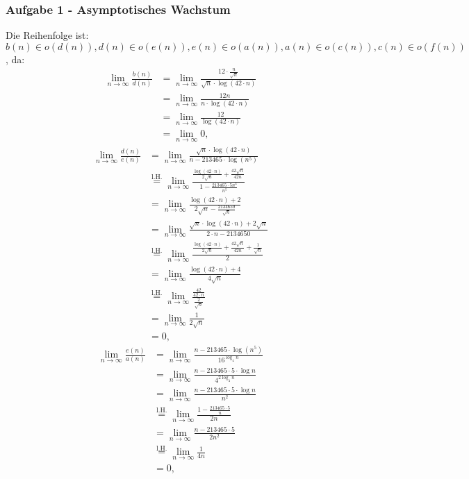 \documentclass[11pt]{scrartcl}
\newcommand{\task}[1]{\subsubsection*{#1}}
\begin{document}
\task{Aufgabe 1 - Asymptotisches Wachstum}
Die Reihenfolge ist: $ b(n) \in o(d(n)), d(n) \in o(e(n)), e(n) \in o(a(n)), a(n) \in o(c(n)), c(n) \in o(f(n)) $, da:
\begin{align*}
	\lim_{n \to \infty} \frac{ b(n) }{ d(n) } &= \lim_{n \to \infty} \frac{ 12 \cdot \frac{ n }{ \sqrt{n}  } }{ \sqrt{n} \cdot \log (42 \cdot n) }  \\
	~ &= \lim_{n \to \infty} \frac{ 12 n }{ n \cdot \log (42 \cdot n ) }  \\
	~ &= \lim_{n \to \infty} \frac{ 12 }{ \log ( 42 \cdot n ) }  \\
	~ &= \lim_{n \to \infty} 0,
\end{align*}
\begin{align*}
	\lim_{n \to \infty} \frac{ d(n) }{ e(n) } &= \lim_{n \to \infty} \frac{ \sqrt{n} \cdot \log (42 \cdot n) }{ n - 213465 \cdot \log ( n^5 ) }  \\
	~ &\overset{\text{l.H.} }{=} \lim_{n \to \infty} \frac{ \frac{ \log (42 \cdot n) }{ 2 \sqrt{n}  } + \frac{ 42 \sqrt{n} }{ 42 n } }{ 1 - \frac{ 213465 \cdot 5n^4 }{ n^5 }  }  \\
	~ &= \lim_{n \to \infty} \frac{ \log ( 42 \cdot n ) + 2 }{ 2 \sqrt{n} - \frac{ 2134650 }{ \sqrt{n}  }  }  \\
	~ &= \lim_{n \to \infty} \frac{ \sqrt{n} \cdot  \log ( 42 \cdot n ) + 2 \sqrt{n}  }{ 2 \cdot  n - 2134650 }  \\
	~ &\overset{\text{l.H.} }{=} \lim_{n \to \infty} \frac{ \frac{ \log (42 \cdot n) }{ 2 \sqrt{n}  } + \frac{ 42 \sqrt{n} }{ 42 n } + \frac{ 1 }{ \sqrt{n}  }  }{ 2 }  \\
	~ &= \lim_{n \to \infty} \frac{ \log (42 \cdot n) + 4 }{ 4 \sqrt{n} } \\
	~ &\overset{\text{l.H.} }{=} \lim_{n \to \infty} \frac{ \frac{ 42 }{ 42 \cdot  n } }{ \frac{ 2 }{ \sqrt{n} } } \\
	~ &= \lim_{n \to \infty} \frac{ 1 }{ 2 \sqrt{n} } \\
	~ &= 0,
\end{align*}
\begin{align*}
	\lim_{n \to \infty} \frac{ e(n) }{ a(n) } &= \lim_{n \to \infty} \frac{ n - 213465 \cdot \log ( n^5 ) }{ 16^{\log _4 n} }  \\
	~ &= \lim_{n \to \infty} \frac{n - 213465 \cdot 5 \cdot \log n}{ 4^{2\log _4n}  } \\
	~ &= \lim_{n \to \infty} \frac{n - 213465 \cdot 5 \cdot \log n}{ n^2 } \\
	~ &\overset{\text{l.H.} }{=} \lim_{n \to \infty}  \frac{ 1 - \frac{ 213465 \cdot 5 }{ n } }{ 2n } \\
	~ &= \lim_{n \to \infty} \frac{ n - 213465 \cdot 5 }{ 2n^2 } \\
	~ &\overset{\text{l.H.} }{=} \lim_{n \to \infty} \frac{ 1 }{ 4n } \\
	~ &= 0,
\end{align*}
\end{document}
